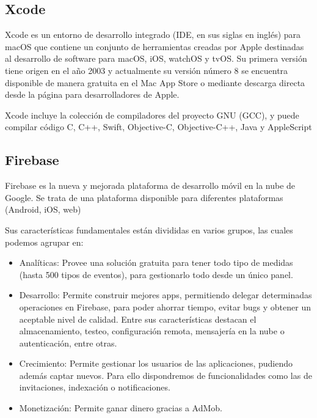 \subsection{Xcode}
Xcode es un entorno de desarrollo integrado (IDE, en sus siglas en inglés) para macOS que contiene un conjunto de herramientas creadas por Apple destinadas al desarrollo de software para macOS, iOS, watchOS y tvOS. Su primera versión tiene origen en el año 2003 y actualmente su versión número 8 se encuentra disponible de manera gratuita en el Mac App Store o mediante descarga directa desde la página para desarrolladores de Apple.

Xcode incluye la colección de compiladores del proyecto GNU (GCC), y puede compilar código C, C++, Swift, Objective-C, Objective-C++, Java y AppleScript \cite{xcode}

\newpage
\subsection{Firebase}
Firebase es la nueva y mejorada plataforma de desarrollo móvil en la nube de Google. Se trata de una plataforma disponible para diferentes plataformas (Android, iOS, web)

Sus características fundamentales están divididas en varios grupos, las cuales podemos agrupar en: \cite{firebase}

\begin{itemize}
    
\item Analíticas: Provee una solución gratuita para tener todo tipo de medidas (hasta 500 tipos de eventos), para gestionarlo todo desde un único panel.
\item Desarrollo: Permite construir mejores apps, permitiendo delegar determinadas operaciones en Firebase, para poder ahorrar tiempo, evitar bugs y obtener un aceptable nivel de calidad. Entre sus características destacan el almacenamiento, testeo, configuración remota, mensajería en la nube o autenticación, entre otras.
\item Crecimiento: Permite gestionar los usuarios de las aplicaciones, pudiendo además captar nuevos. Para ello dispondremos de funcionalidades como las de invitaciones, indexación o notificaciones.
\item Monetización: Permite ganar dinero gracias a AdMob.

\end{itemize}
